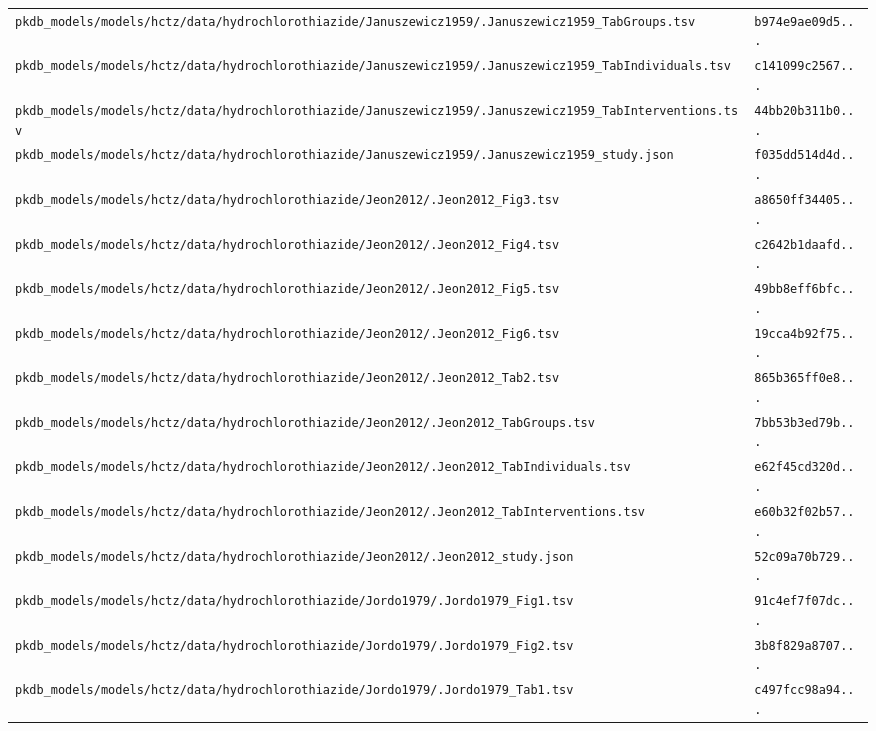 \begin{longtable}{ll}
\texttt{pkdb\_models/models/hctz/data/hydrochlorothiazide/Januszewicz1959/.Januszewicz1959\_TabGroups.tsv} & \texttt{b974e9ae09d5...} \\
\texttt{pkdb\_models/models/hctz/data/hydrochlorothiazide/Januszewicz1959/.Januszewicz1959\_TabIndividuals.tsv} & \texttt{c141099c2567...} \\
\texttt{pkdb\_models/models/hctz/data/hydrochlorothiazide/Januszewicz1959/.Januszewicz1959\_TabInterventions.tsv} & \texttt{44bb20b311b0...} \\
\texttt{pkdb\_models/models/hctz/data/hydrochlorothiazide/Januszewicz1959/.Januszewicz1959\_study.json} & \texttt{f035dd514d4d...} \\
\texttt{pkdb\_models/models/hctz/data/hydrochlorothiazide/Jeon2012/.Jeon2012\_Fig3.tsv} & \texttt{a8650ff34405...} \\
\texttt{pkdb\_models/models/hctz/data/hydrochlorothiazide/Jeon2012/.Jeon2012\_Fig4.tsv} & \texttt{c2642b1daafd...} \\
\texttt{pkdb\_models/models/hctz/data/hydrochlorothiazide/Jeon2012/.Jeon2012\_Fig5.tsv} & \texttt{49bb8eff6bfc...} \\
\texttt{pkdb\_models/models/hctz/data/hydrochlorothiazide/Jeon2012/.Jeon2012\_Fig6.tsv} & \texttt{19cca4b92f75...} \\
\texttt{pkdb\_models/models/hctz/data/hydrochlorothiazide/Jeon2012/.Jeon2012\_Tab2.tsv} & \texttt{865b365ff0e8...} \\
\texttt{pkdb\_models/models/hctz/data/hydrochlorothiazide/Jeon2012/.Jeon2012\_TabGroups.tsv} & \texttt{7bb53b3ed79b...} \\
\texttt{pkdb\_models/models/hctz/data/hydrochlorothiazide/Jeon2012/.Jeon2012\_TabIndividuals.tsv} & \texttt{e62f45cd320d...} \\
\texttt{pkdb\_models/models/hctz/data/hydrochlorothiazide/Jeon2012/.Jeon2012\_TabInterventions.tsv} & \texttt{e60b32f02b57...} \\
\texttt{pkdb\_models/models/hctz/data/hydrochlorothiazide/Jeon2012/.Jeon2012\_study.json} & \texttt{52c09a70b729...} \\
\texttt{pkdb\_models/models/hctz/data/hydrochlorothiazide/Jordo1979/.Jordo1979\_Fig1.tsv} & \texttt{91c4ef7f07dc...} \\
\texttt{pkdb\_models/models/hctz/data/hydrochlorothiazide/Jordo1979/.Jordo1979\_Fig2.tsv} & \texttt{3b8f829a8707...} \\
\texttt{pkdb\_models/models/hctz/data/hydrochlorothiazide/Jordo1979/.Jordo1979\_Tab1.tsv} & \texttt{c497fcc98a94...} \\

\end{longtable}
